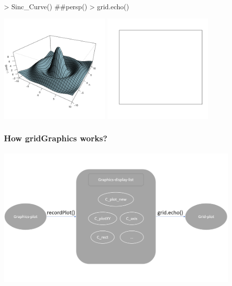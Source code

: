\documentclass{beamer}
\begin{document}
\begin{frame}[fragile]
\begin{Schunk}
\begin{Sinput}
> Sinc_Curve() ##persp()
> grid.echo()
\end{Sinput}
\end{Schunk}
\begin{center}
  \includegraphics[height = 5.5cm, width = 5.5cm]{plot/persp_1}
  \includegraphics[height = 5.5cm, width = 5.5cm]{plot/blank}
\end{center}
  
\end{frame}





\begin{frame}[fragile]
\frametitle{How \textbf{gridGraphics} works?}
\begin{center}
  \includegraphics[height = 7.2cm, width = 12.2cm]{plot/display_list.PNG}
\end{center}
\end{frame}
\end{document}
